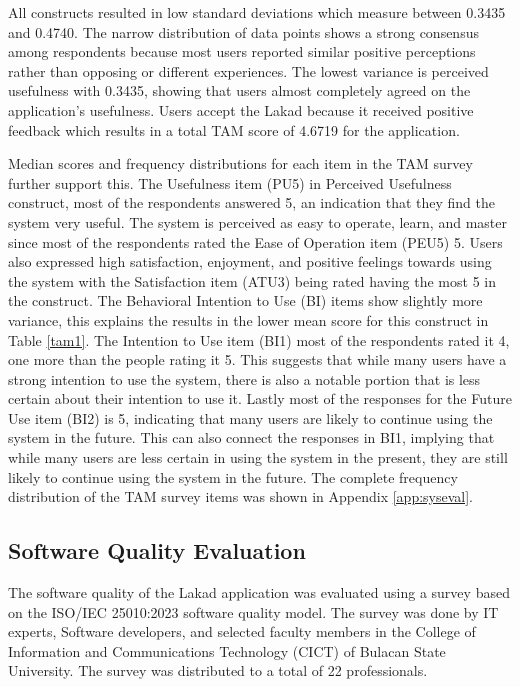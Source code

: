 All constructs resulted in low standard deviations which measure between 0.3435 and 0.4740. The narrow distribution of data points shows a strong consensus among respondents because most users reported similar positive perceptions rather than opposing or different experiences. The lowest variance is perceived usefulness with 0.3435, showing that users almost completely agreed on the application’s usefulness. Users accept the Lakad because it received positive feedback which results in a total TAM score of 4.6719 for the application.

Median scores and frequency distributions for each item in the TAM survey further support this. The Usefulness item (PU5) in Perceived Usefulness construct, most of the respondents answered 5, an indication that they find the system very useful. The system is perceived as easy to operate, learn, and master since most of the respondents rated the Ease of Operation item (PEU5) 5. Users also expressed high satisfaction, enjoyment, and positive feelings towards using the system with the Satisfaction item (ATU3) being rated having the most 5 in the construct. The Behavioral Intention to Use (BI) items show slightly more variance, this explains the results in the lower mean score for this construct in Table \ref{tam1}. The Intention to Use item (BI1) most of the respondents rated it 4, one more than the people rating it 5. This suggests that while many users have a strong intention to use the system, there is also a notable portion that is less certain about their intention to use it. Lastly most of the responses for the Future Use item (BI2) is 5, indicating that many users are likely to continue using the system in the future. This can also connect the responses in BI1, implying that while many users are less certain in using the system in the present, they are still likely to continue using the system in the future. The complete frequency distribution of the TAM survey items was shown in Appendix \ref{app:syseval}.

\subsection{Software Quality Evaluation}

The software quality of the Lakad application was evaluated using a survey based on the ISO/IEC 25010:2023 software quality model. The survey was done by IT experts, Software developers, and selected faculty members in the College of Information and Communications Technology (CICT) of Bulacan State University. The survey was distributed to a total of 22 professionals.

